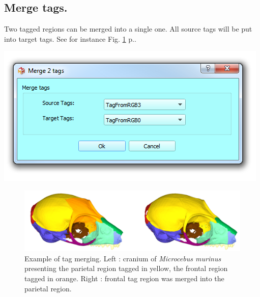 \subsection{Merge tags.}
\noindent
\begin{minipage}{0.5\textwidth}
Two tagged regions can be merged into a single one. All source tags will be put into target tags. See for instance Fig. \ref{merge_tags} p.\pageref{merge_tags}.\end{minipage}    
\begin{minipage}{0.5\textwidth}\centering
  \includegraphics[scale=0.5]{images/12/merge_tags.png}
 \end{minipage} 
\noindent
\begin{figure}
  \centering
  \includegraphics[scale=0.25]{images/12/merge_example.png} 
	\caption{Example of tag merging. Left : cranium of \textit{Microcebus murinus} presenting the parietal region
tagged in yellow, the frontal region tagged in orange. Right : frontal tag region was merged into
the parietal region.}
\label{merge_tags}
\end{figure}